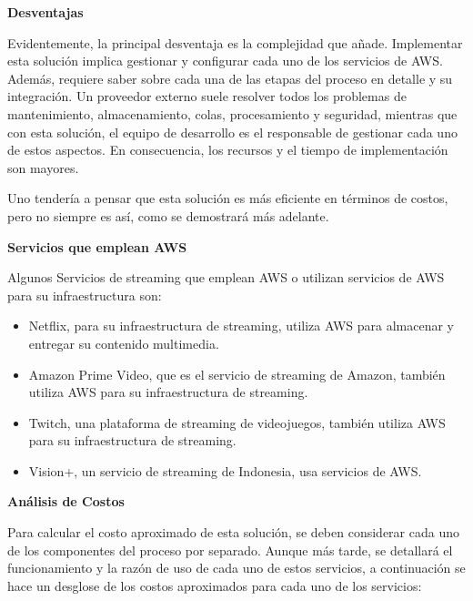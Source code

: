 \textbf{Desventajas}

Evidentemente, la principal desventaja es la complejidad que añade. Implementar esta solución implica gestionar y configurar cada uno de los servicios de AWS. Además, requiere saber sobre cada una de las etapas del proceso en detalle y su integración. Un proveedor externo suele resolver todos los problemas de mantenimiento, almacenamiento, colas, procesamiento y seguridad, mientras que con esta solución, el equipo de desarrollo es el responsable de gestionar cada uno de estos aspectos. En consecuencia, los recursos y el tiempo de implementación son mayores. 

Uno tendería a pensar que esta solución es más eficiente en términos de costos, pero no siempre es así, como se demostrará más adelante.  


\clearpage
\textbf{Servicios que emplean AWS}

Algunos Servicios de streaming que emplean AWS o utilizan servicios de AWS para su infraestructura son:

\begin{itemize}
    \item Netflix, para su infraestructura de streaming, utiliza AWS para almacenar y entregar su contenido multimedia.
    \item Amazon Prime Video, que es el servicio de streaming de Amazon, también utiliza AWS para su infraestructura de streaming.
    \item Twitch, una plataforma de streaming de videojuegos, también utiliza AWS para su infraestructura de streaming.
    \item Vision+, un servicio de streaming de Indonesia, usa servicios de AWS. 
\end{itemize}


\textbf{Análisis de Costos}

Para calcular el costo aproximado de esta solución, se deben considerar cada uno de los componentes del proceso por separado. Aunque más tarde, se detallará el funcionamiento y la razón de uso de cada uno de estos servicios, a continuación se hace un desglose de los costos aproximados para cada uno de los servicios:

